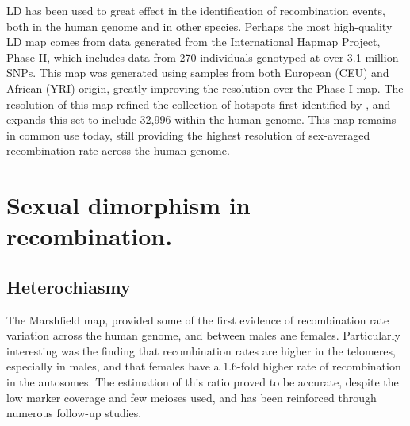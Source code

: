 LD has been used to great effect in the identification of recombination events, both in the human genome and in other species.
Perhaps the most high-quality LD map comes from data generated from the International Hapmap Project, Phase II\cite{hapmap2007}, which includes data from 270 individuals genotyped at over 3.1 million SNPs.
This map was generated using samples from both European (CEU) and African (YRI) origin, greatly improving the resolution over the Phase I map.
The resolution of this map refined the collection of hotspots first identified by \citet{Myers2005}, and expands this set to include 32,996 within the human genome.
This map remains in common use today, still providing the highest resolution of sex-averaged recombination rate across the human genome.








\section{Sexual dimorphism in recombination.}
\subsection{Heterochiasmy}

The Marshfield map\cite{Broman1998}, provided some of the first evidence of recombination rate variation across the human genome, and between males ane females.
Particularly interesting was the finding that recombination rates are higher in the telomeres, especially in males, and that females have a 1.6-fold higher rate of recombination in the autosomes.
The estimation of this ratio proved to be accurate, despite the low marker coverage and few meioses used, and has been reinforced through numerous follow-up studies\cite{Broman2000,Kong2002,Coop2008,Kong2010,Bleazard2013,Campbell2015,Bherer2016}.

